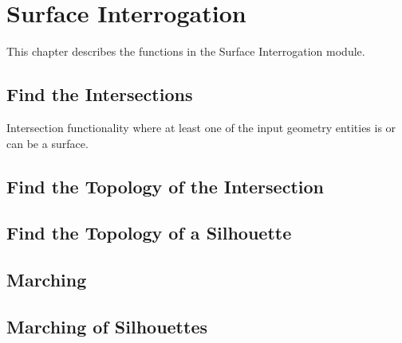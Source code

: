 \chapter{Surface Interrogation}
\label{surfaceinterrogation}
This chapter describes the functions in the Surface Interrogation module.


\pgsbreak

\section{Find the Intersections}
Intersection functionality where at least one of the input geometry entities is or can be a surface.

\pgsbreak

\pgsbreak

\pgsbreak

\pgsbreak

\pgsbreak

\pgsbreak

\pgsbreak

\pgsbreak

\pgsbreak

\pgsbreak

\pgsbreak

\pgsbreak
\section{Find the Topology of the Intersection}

\pgsbreak

\pgsbreak

\pgsbreak

\pgsbreak

\pgsbreak

\pgsbreak

\pgsbreak
\section{Find the Topology of a Silhouette}

\pgsbreak

\pgsbreak

\pgsbreak
\section{Marching}

\pgsbreak

\pgsbreak

\pgsbreak

\pgsbreak

\pgsbreak

\pgsbreak

\pgsbreak
\section{Marching of Silhouettes}

\pgsbreak

\pgsbreak

\pgsbreak

\pgsbreak

\pgsbreak
